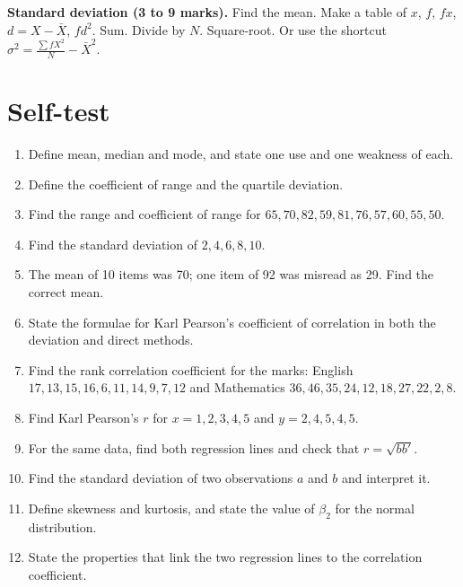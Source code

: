 \documentclass[11pt,a4paper]{article}
\begin{document}
\begin{answerbox}
\textbf{Standard deviation (3 to 9 marks).} Find the mean. Make a table of $x$, $f$, $fx$, $d=X-\bar X$, $fd^2$. Sum. Divide by $N$. Square-root. Or use the shortcut $\sigma^2=\frac{\sum fX^2}{N}-\bar X^2$.
\end{answerbox}

\section{Self-test}

\begin{enumerate}
\item Define mean, median and mode, and state one use and one weakness of each.
\item Define the coefficient of range and the quartile deviation.
\item Find the range and coefficient of range for $65,70,82,59,81,76,57,60,55,50$.
\item Find the standard deviation of $2,4,6,8,10$.
\item The mean of 10 items was 70; one item of 92 was misread as 29. Find the correct mean.
\item State the formulae for Karl Pearson's coefficient of correlation in both the deviation and direct methods.
\item Find the rank correlation coefficient for the marks: English $17,13,15,16,6,11,14,9,7,12$ and Mathematics $36,46,35,24,12,18,27,22,2,8$.
\item Find Karl Pearson's $r$ for $x=1,2,3,4,5$ and $y=2,4,5,4,5$.
\item For the same data, find both regression lines and check that $r=\sqrt{bb'}$.
\item Find the standard deviation of two observations $a$ and $b$ and interpret it.
\item Define skewness and kurtosis, and state the value of $\beta_2$ for the normal distribution.
\item State the properties that link the two regression lines to the correlation coefficient.
\end{enumerate}
\end{document}
